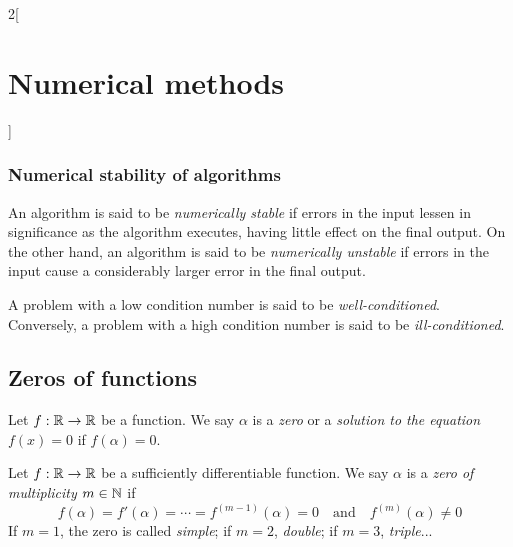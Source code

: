 \documentclass[../../../main.tex]{subfiles}
\begin{document}
\begin{multicols}{2}[\section{Numerical methods}]
    \subsubsection*{Numerical stability of algorithms}
    \begin{definition}
        An algorithm is said to be \textit{numerically stable} if  errors in the input lessen in significance as the algorithm executes, having little effect on the final output. On the other hand, an algorithm is said to be \textit{numerically unstable} if errors in the input cause a considerably larger error in the final output.
    \end{definition}
    \begin{definition}
        A problem with a low condition number is said to be \textit{well-conditioned}. Conversely, a problem with a high condition number is said to be \textit{ill-conditioned}.
    \end{definition}
    \subsection{Zeros of functions}
    \begin{definition}
        Let $f:\mathbb{R}\rightarrow\mathbb{R}$ be a function. We say $\alpha$ is a \textit{zero} or a \textit{solution to the equation $f(x)=0$} if $f(\alpha)=0$.
    \end{definition}
    \begin{definition}
        Let $f:\mathbb{R}\rightarrow\mathbb{R}$ be a sufficiently differentiable function. We say $\alpha$ is a \textit{zero of multiplicity $m\in\mathbb{N}$} if $$f(\alpha)=f'(\alpha)=\cdots=f^{(m-1)}(\alpha)=0\quad\text{and}\quad f^{(m)}(\alpha)\ne0$$ If $m=1$, the zero is called \textit{simple}; if $m=2$, \textit{double}; if $m=3$, \textit{triple}...
    \end{definition}

\end{multicols}
\end{document}
